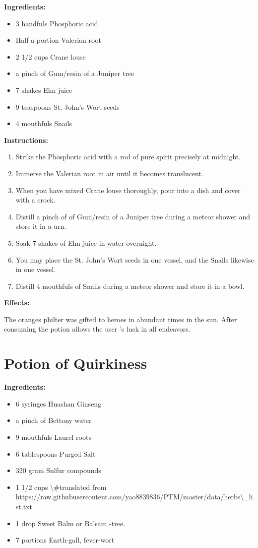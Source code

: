 \documentclass{article}
\begin{document}
\textbf{Ingredients:}

\begin{itemize}
  \item 3 handfuls Phosphoric acid
  \item Half a portion Valerian root
  \item 2 1/2 cups Crane louse
  \item a pinch of Gum/resin  of a Juniper tree
  \item 7 shakes Elm juice
  \item 9 teaspoons St. John's Wort seeds
  \item 4 mouthfuls Snails
\end{itemize}

\textbf{Instructions:}

\begin{enumerate}
  \item Strike the Phosphoric acid with a rod of pure spirit precisely at midnight.
  \item Immerse the Valerian root in air until it becomes translucent.
  \item When you have mixed Crane louse thoroughly, pour into a dish and cover with a crock.
  \item Distill a pinch of of Gum/resin  of a Juniper tree during a meteor shower and store it in a urn.
  \item Soak 7 shakes of Elm juice in water overnight.
  \item You may place the St. John's Wort seeds in one vessel, and the Snails likewise in one vessel.
  \item Distill 4 mouthfuls of Snails during a meteor shower and store it in a bowl.
\end{enumerate}

\textbf{Effects:}

The oranges philter was gifted to heroes in abundant times in the sun. After consuming the potion allows the user 's luck in all endeavors.

\newpage
\section*{Potion of Quirkiness}

\textbf{Ingredients:}

\begin{itemize}
  \item 6 syringes Huashan Ginseng
  \item a pinch of Bettony water
  \item 9 mouthfuls Laurel roots
  \item 6 tablespoons Purged Salt
  \item 320 gram Sulfur compounds
  \item 1 1/2 cups \textbackslash{}#translated from https://raw.githubusercontent.com/yao8839836/PTM/master/data/herbs\textbackslash{}_list.txt
  \item 1 drop Sweet Balm or Balsam -tree.
  \item 7 portions Earth-gall, fever-wort
\end{itemize}
\end{document}
